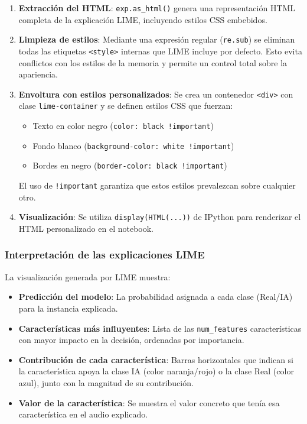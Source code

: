 \begin{enumerate}
    \item \textbf{Extracción del HTML}: \texttt{exp.as\_html()} genera una representación HTML completa de la explicación LIME, incluyendo estilos CSS embebidos.
    
    \item \textbf{Limpieza de estilos}: Mediante una expresión regular (\texttt{re.sub}) se eliminan todas las etiquetas \texttt{<style>} internas que LIME incluye por defecto. Esto evita conflictos con los estilos de la memoria y permite un control total sobre la apariencia.
    
    \item \textbf{Envoltura con estilos personalizados}: Se crea un contenedor \texttt{<div>} con clase \texttt{lime-container} y se definen estilos CSS que fuerzan:
    \begin{itemize}
        \item Texto en color negro (\texttt{color: black !important})
        \item Fondo blanco (\texttt{background-color: white !important})
        \item Bordes en negro (\texttt{border-color: black !important})
    \end{itemize}
    El uso de \texttt{!important} garantiza que estos estilos prevalezcan sobre cualquier otro.
    
    \item \textbf{Visualización}: Se utiliza \texttt{display(HTML(...))} de IPython para renderizar el HTML personalizado en el notebook.
\end{enumerate}

\subsubsection*{Interpretación de las explicaciones LIME}

La visualización generada por LIME muestra:

\begin{itemize}
    \item \textbf{Predicción del modelo}: La probabilidad asignada a cada clase (Real/IA) para la instancia explicada.
    
    \item \textbf{Características más influyentes}: Lista de las \texttt{num\_features} características con mayor impacto en la decisión, ordenadas por importancia.
    
    \item \textbf{Contribución de cada característica}: Barras horizontales que indican si la característica apoya la clase IA (color naranja/rojo) o la clase Real (color azul), junto con la magnitud de su contribución.
    
    \item \textbf{Valor de la característica}: Se muestra el valor concreto que tenía esa característica en el audio explicado.
\end{itemize}


